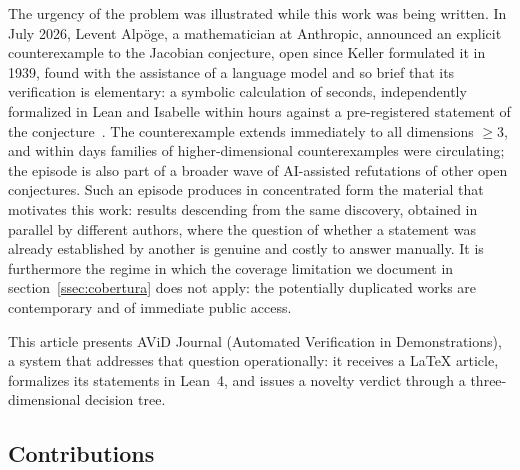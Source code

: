 The urgency of the problem was illustrated while this work was being written. In July 2026, Levent Alp\"oge, a mathematician at Anthropic, announced an explicit counterexample to the Jacobian conjecture, open since Keller formulated it in 1939, found with the assistance of a language model and so brief that its verification is elementary: a symbolic calculation of seconds, independently formalized in Lean and Isabelle within hours against a pre-registered statement of the conjecture~\cite{alpoge2026}. The counterexample extends immediately to all dimensions $\geq 3$, and within days families of higher-dimensional counterexamples were circulating; the episode is also part of a broader wave of AI-assisted refutations of other open conjectures. Such an episode produces in concentrated form the material that motivates this work: results descending from the same discovery, obtained in parallel by different authors, where the question of whether a statement was already established by another is genuine and costly to answer manually. It is furthermore the regime in which the coverage limitation we document in section~\ref{ssec:cobertura} does not apply: the potentially duplicated works are contemporary and of immediate public access.

This article presents AViD Journal (Automated Verification in Demonstrations), a system that addresses that question operationally: it receives a LaTeX article, formalizes its statements in Lean~4, and issues a novelty verdict through a three-dimensional decision tree.

\subsection{Contributions}

